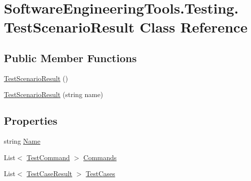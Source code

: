 \hypertarget{class_software_engineering_tools_1_1_testing_1_1_test_scenario_result}{\section{Software\+Engineering\+Tools.\+Testing.\+Test\+Scenario\+Result Class Reference}
\label{class_software_engineering_tools_1_1_testing_1_1_test_scenario_result}
}
\subsection*{Public Member Functions}
\begin{DoxyCompactItemize}
\item 
\hyperlink{class_software_engineering_tools_1_1_testing_1_1_test_scenario_result_af24061bb290dd14e4ba3ce804226a4c1}{Test\+Scenario\+Result} ()
\item 
\hyperlink{class_software_engineering_tools_1_1_testing_1_1_test_scenario_result_ad5c0b19852dc0b0611791382d4f3299a}{Test\+Scenario\+Result} (string name)
\end{DoxyCompactItemize}
\subsection*{Properties}
\begin{DoxyCompactItemize}
\item 
string \hyperlink{class_software_engineering_tools_1_1_testing_1_1_test_scenario_result_a60b47271609a2aa0a0eb3021a5ebb988}{Name}
\item 
List$<$ \hyperlink{class_software_engineering_tools_1_1_testing_1_1_test_command}{Test\+Command} $>$ \hyperlink{class_software_engineering_tools_1_1_testing_1_1_test_scenario_result_a58554b141c207282fcd65b8b50534a99}{Commands}
\item 
List$<$ \hyperlink{class_software_engineering_tools_1_1_testing_1_1_test_case_result}{Test\+Case\+Result} $>$ \hyperlink{class_software_engineering_tools_1_1_testing_1_1_test_scenario_result_ae171a04a0ced528c816ad8b95f566ffb}{Test\+Cases}
\end{DoxyCompactItemize}


